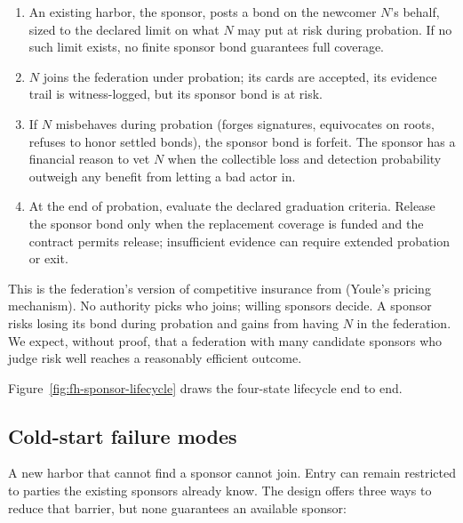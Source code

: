 \documentclass[11pt,a4paper]{article}
\theoremstyle{definition}
\theoremstyle{remark}
\begin{document}
%
\begin{enumerate}[nosep]
\item An existing harbor, the sponsor, posts a bond on the newcomer $N$'s behalf, sized to the declared limit on what $N$ may put at risk during probation. If no
such limit exists, no finite sponsor bond guarantees full coverage.
\item $N$ joins the federation under probation; its cards are accepted, its evidence trail is witness-logged, but its sponsor bond is at risk.
\item If $N$ misbehaves during probation (forges signatures, equivocates on roots, refuses to honor settled bonds), the sponsor bond is forfeit. The sponsor has a financial reason to vet $N$ when the collectible loss and
detection probability outweigh any benefit from letting a bad actor in.
\item At the end of probation, evaluate the declared graduation criteria. Release
the sponsor bond only when the replacement coverage is funded and the contract
permits release; insufficient evidence can require extended probation or exit.
\end{enumerate}

This is the federation's version of competitive insurance from  (Youle's pricing mechanism). No authority picks who joins; willing sponsors decide. A sponsor risks losing its bond during probation and gains from having $N$ in the federation. We expect, without proof, that a federation with many candidate sponsors who judge risk well reaches a reasonably efficient outcome.

Figure~\ref{fig:fh-sponsor-lifecycle} draws the four-state lifecycle end to end.



\subsection{Cold-start failure modes}\label{sec:fh-cold-start}

A new harbor that cannot find a sponsor cannot join. Entry can remain restricted to parties the existing sponsors already know. The design offers three ways to reduce that barrier, but none guarantees an available sponsor:
\end{document}
